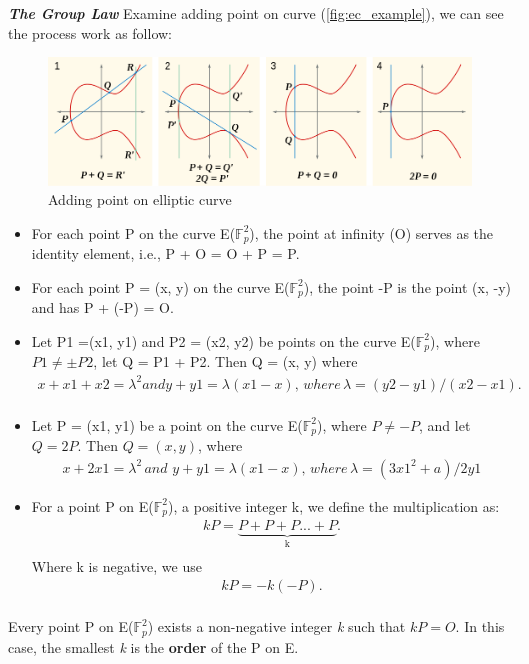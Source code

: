 {\textit {\textbf{The Group Law}}}
Examine adding point on curve (\autoref{fig:ec_example}), we can see the process work as follow:
\begin{figure}[h!]
	\centering
	\includegraphics[width=1\textwidth]{images/adding_point.png}
	\caption[Adding point on elliptic curve]{Adding point on elliptic curve}
	\label{fig:add_point}
\end{figure}
\begin{itemize}
	\item For each point P on the curve E($\mathbb{F}_{p}^2$), the point at infinity (O) serves as the identity element, i.e., P + O = O + P = P.
	\item For each point P = (x, y) on the curve E($\mathbb{F}_{p}^2$), the point -P is the point (x, -y) and has P + (-P) = O.
	\item Let P1 =(x1, y1) and P2 = (x2, y2) be points on the curve E($\mathbb{F}_{p}^2$), where $P1 \neq \pm P2$, let Q = P1 + P2. Then Q = (x, y) where  \medskip
	\begin{align*}
		x + x1 + x2 = \lambda^2 and y + y1 = \lambda(x1 - x), \,	where \, \lambda = (y2 - y1)/(x2 - x1). \\
	\end{align*}
	\item Let P = (x1, y1) be a point on the curve E($\mathbb{F}_{p}^2$), where $P \neq -P$, and let $Q = 2P$. Then $Q = (x, y)$, where \medskip
	\begin{align*}
		x + 2x1 = \lambda^2 \, and \, \, y + y1 = \lambda(x1 - x), \, where \, \lambda = (3x1^2 + a)/2y1
	\end{align*}
	\item For a point P on E($\mathbb{F}_{p}^2$), a positive integer k, we define the multiplication as: \medskip
	\begin{align*}
		kP = \underbrace{P + P + P ... + P}_\text{k}. \\
	\end{align*}
	Where k is negative, we use
	\begin{align*}
		kP = -k(-P). \\
	\end{align*}
\end{itemize} 
Every point P on E($\mathbb{F}_{p}^2$) exists a non-negative integer \emph{k} such that $kP = O$. In this case, the smallest \emph{k} is the {\bf order} of the P on E.

